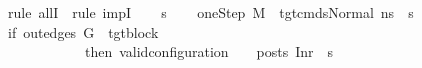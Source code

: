 \begin{isabellebody}
\isamarkupfalse%
\ {\isacharparenleft}{\kern0pt}rule\ allI\ {\isacharbar}{\kern0pt}\ rule\ impI{\isacharparenright}{\kern0pt}{\isacharplus}{\kern0pt}\isanewline
\ \ \isamarkupfalse%
\ s{}{\isacharprime}{\kern0pt}\isanewline
\ \ \isamarkupfalse%
\ oneStep{\isacharcolon}{\kern0pt}\ {\isachardoublequoteopen}M{\isacharcomma}{\kern0pt}{\isasymLambda}{\isacharcomma}{\kern0pt}{\isasymGamma}{\isacharcomma}{\kern0pt}{\isasymOmega}\ {\isasymturnstile}\ {\isasymlangle}tgt{\isacharunderscore}{\kern0pt}cmds{\isacharcomma}{\kern0pt}Normal\ ns{\isasymrangle}\ {\isacharbrackleft}{\kern0pt}{\isasymrightarrow}{\isacharbrackright}{\kern0pt}\ s{}{\isacharprime}{\kern0pt}{\isachardoublequoteclose}\isanewline
\ \ \isamarkupfalse%
\ {\isachardoublequoteopen}{\isacharparenleft}{\kern0pt}{\isacharparenleft}{\kern0pt}if\ out{\isacharunderscore}{\kern0pt}edges\ G{\isacharprime}{\kern0pt}\ {\isacharbang}{\kern0pt}\ tgt{\isacharunderscore}{\kern0pt}block\ {\isacharequal}{\kern0pt}\ {\isacharbrackleft}{\kern0pt}{\isacharbrackright}{\kern0pt}\isanewline
\ \ \ \ \ \ \ \ \ \ \ \ then\ valid{\isacharunderscore}{\kern0pt}configuration\ {\isasymLambda}\ {\isasymGamma}\ {\isasymOmega}\ posts\ {\isacharparenleft}{\kern0pt}Inr\ {\isacharparenleft}{\kern0pt}{\isacharparenright}{\kern0pt}{\isacharparenright}{\kern0pt}\ s{}{\isacharprime}{\kern0pt}\isanewline

\end{isabellebody}
